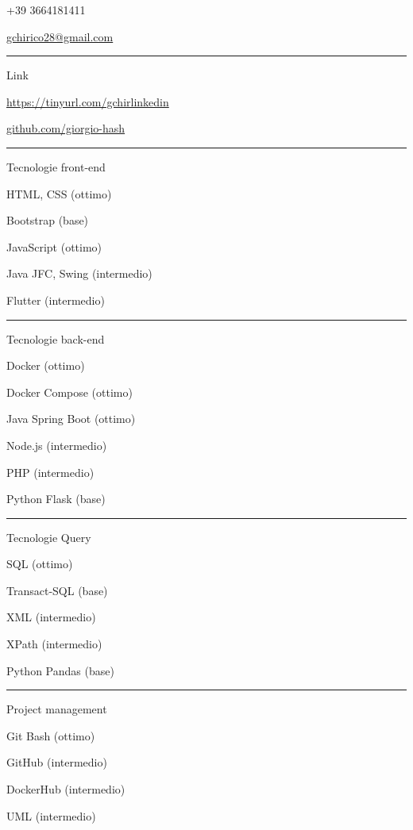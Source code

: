 \documentclass[a4paper]{letter}
\begin{document}
\begin{minipage}[t]{0.30\textwidth}
\faPhone \quad +39 3664181411

\faEnvelope \quad \href{mailto://gchirico28@gmail.com}{gchirico28@gmail.com}

\rule{\linewidth}{0.4pt}

{\large Link}

\faLinkedin \quad \href{https://tinyurl.com/gchirlinkedin}{https://tinyurl.com/gchirlinkedin}

\faGithub \quad \href{https://github.com/giorgio-hash}{github.com/giorgio-hash}

\rule{\linewidth}{0.4pt}

{\large Tecnologie front-end}

\faCode \quad HTML, CSS (ottimo)

\faCode \quad Bootstrap (base)

\faCode \quad JavaScript (ottimo)

\faCode \quad Java JFC, Swing (intermedio)

\faCode \quad Flutter (intermedio)



\rule{\linewidth}{0.4pt}

{\large Tecnologie back-end}

\faCode \quad Docker (ottimo)

\faCode \quad Docker Compose (ottimo)

\faCode \quad Java Spring Boot (ottimo)

\faCode \quad Node.js (intermedio)

\faCode \quad PHP (intermedio)

\faCode \quad Python Flask (base)

\rule{\linewidth}{0.4pt}


{\large Tecnologie Query}

\faCode \quad SQL (ottimo)

\faCode \quad Transact-SQL (base)

\faCode \quad XML (intermedio)

\faCode \quad XPath (intermedio)

\faCode \quad Python Pandas (base)

\rule{\linewidth}{0.4pt}

{\large Project management}

\faCode \quad Git Bash (ottimo)

\faCode \quad GitHub (intermedio)

\faCode \quad DockerHub (intermedio)

\faCode \quad UML (intermedio)



\end{minipage}
\end{document}

